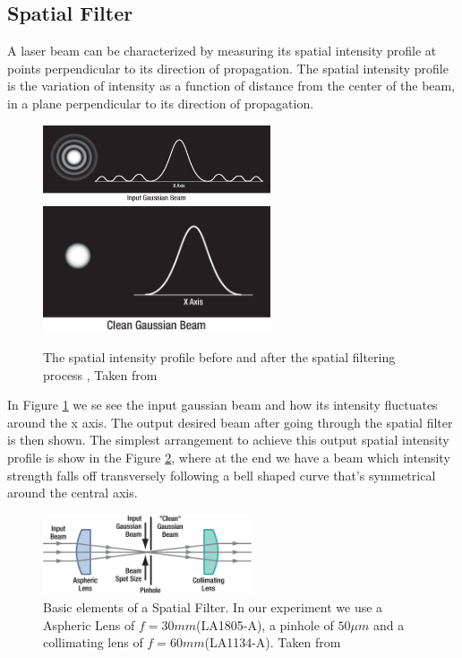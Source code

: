\subsection{Spatial Filter}
A laser beam can be characterized by measuring its spatial intensity profile at points perpendicular to its direction of propagation. 
The spatial intensity profile is the variation of intensity as a function of distance from the center of the beam, in a plane perpendicular to its direction of propagation.
\begin{figure}[h!]
\centering
{  \includegraphics[width=0.6\textwidth]{Figures/inputBeam.png} }
{  \includegraphics[width=0.6\textwidth]{Figures/outputBeam.png} }
\caption{The spatial intensity profile before and after the spatial filtering process , Taken from \cite{thorlabs}}
 \label{fig:inputOutputBeam}
\end{figure}
In Figure \ref{fig:inputOutputBeam} we se see the input gaussian beam 
and how its intensity fluctuates around the x axis. The output desired beam after going through the spatial filter is then shown.
The simplest arrangement to achieve this output spatial intensity profile is show in the Figure \ref{fig:spatialFilter}, 
where at the end we have a beam which intensity strength falls off transversely following a bell shaped curve that's symmetrical around the central axis.
\begin{figure}[h!]
\centering
\includegraphics[width=0.55\textwidth]{Figures/spatialFilter.png}
\caption{Basic elements of a Spatial Filter. In our experiment we use a Aspheric Lens of $f=30 mm$(LA1805-A), a pinhole of $50 \mu m$ and a collimating lens of $f=60 mm$(LA1134-A). Taken from \cite{thorlabs}} 
\label{fig:spatialFilter}
\end{figure}
